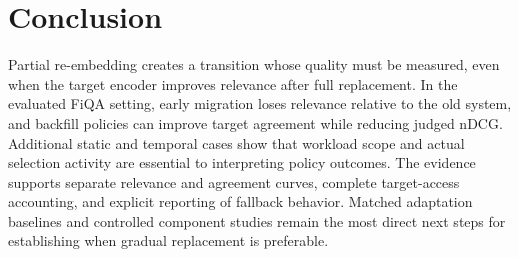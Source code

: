 \documentclass[runningheads]{llncs}
\begin{document}
\section{Conclusion}

Partial re-embedding creates a transition whose quality must be measured, even when the target encoder improves relevance after full replacement. In the evaluated FiQA setting, early migration loses relevance relative to the old system, and backfill policies can improve target agreement while reducing judged nDCG. Additional static and temporal cases show that workload scope and actual selection activity are essential to interpreting policy outcomes. The evidence supports separate relevance and agreement curves, complete target-access accounting, and explicit reporting of fallback behavior. Matched adaptation baselines and controlled component studies remain the most direct next steps for establishing when gradual replacement is preferable.



\end{document}
